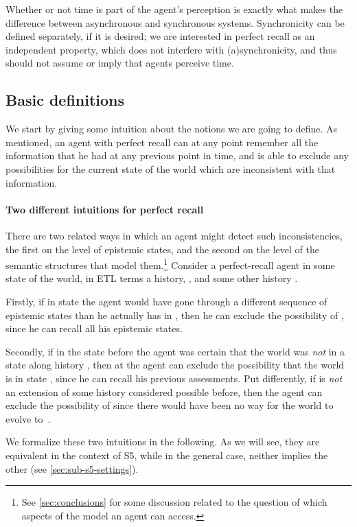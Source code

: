\documentclass{article}
\newcounter{#1}
\begin{document}
Whether or not time is part of the agent's perception
is exactly what makes the difference between asynchronous and synchronous systems.
Synchronicity can be defined separately, if it is desired;
we are interested in perfect recall as an independent property,
which does not interfere with (a)synchronicity,
and thus should not assume or imply that agents perceive time.

\subsection{Basic definitions}
\label{sec:basic-definitions}

We start by giving some intuition about the notions we are going to define.
As mentioned, an agent with perfect recall can at any point
remember all the information that he had at any previous point in time,
and is able to exclude any possibilities for the current state of the world
which are inconsistent with that information.

\paragraph{Two different intuitions for perfect recall}
\label{sec:intuitions}

There are two related ways in which an agent might detect such inconsistencies,
the first on the level of epistemic states,
and the second on the level of the semantic structures that model them.\footnote{See \cref{sec:conclusions} for some discussion
related to the question of which aspects of the model an agent can access.}
Consider a perfect-recall agent in some state of the world, in ETL terms a history, ,
and some other history .

Firstly, if in state  the agent would have gone through a different sequence of epistemic states
than he actually has in ,
then he can exclude the possibility of , since he can recall all his epistemic states.

Secondly, if in the state before  the agent was certain
that the world was \emph{not} in a state along history ,
then at  the agent can exclude the possibility that the world is in state ,
since he can recall his previous assessments.
Put differently, if  is \emph{not} an extension of some history considered possible before,
then the agent can exclude the possibility of  since there would have been no way for the world to evolve to~.

We formalize these two intuitions in the following.
As we will see, they are equivalent in the context of S5,
while in the general case, neither implies the other (see \cref{sec:sub-s5-settings}).
\end{document}
